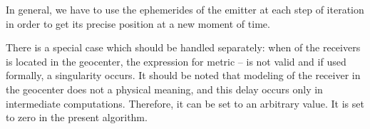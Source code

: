   In general, we have to use the ephemerides of the emitter at each step of
iteration in order to get its precise position at a new moment of time.

  There is a special case which should be handled separately: when of the
receivers is located in the geocenter, the expression for metric
-- is not valid and if used formally, a singularity
occurs. It should be noted that modeling of the receiver in the geocenter
does not a physical meaning, and this delay occurs only in intermediate
computations. Therefore, it can be set to an arbitrary value. It is set
to zero in the present algorithm.

\bigskip


